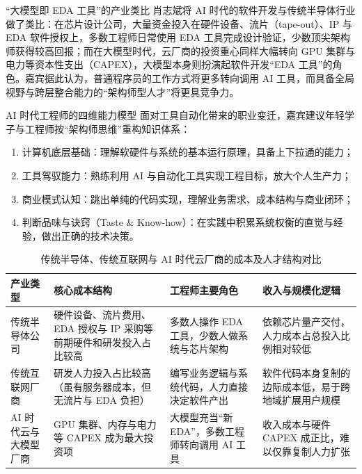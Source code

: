 \documentclass[UTF8,a4paper,11pt,fontset=fandol]{ctexart}
\begin{document}
\begin{importantbox}{“大模型即 EDA 工具”的产业类比}
肖志斌将 AI 时代的软件开发与传统半导体行业做了类比：在芯片设计公司，大量资金投入在硬件设备、流片（tape-out）、IP 与 EDA 软件授权上，多数工程师日常使用 EDA 工具完成设计验证，少数顶尖架构师获得较高回报；而在大模型时代，云厂商的投资重心同样大幅转向 GPU 集群与电力等资本性支出（CAPEX），大模型本身则扮演起软件开发“EDA 工具”的角色。嘉宾据此认为，普通程序员的工作方式将更多转向调用 AI 工具，而具备全局视野与跨层整合能力的“架构师型人才”将更具竞争力。
\end{importantbox}
\begin{knowledgebox}{AI 时代工程师的四维能力模型}
面对工具自动化带来的职业变迁，嘉宾建议年轻学子与工程师按“架构师思维”重构知识体系：
\begin{enumerate}
\item 计算机底层基础：理解软硬件与系统的基本运行原理，具备上下拉通的能力；
\item 工具驾驭能力：熟练利用 AI 与自动化工具实现工程目标，放大个人生产力；
\item 商业模式认知：跳出单纯的代码实现，理解业务需求、成本结构与商业闭环；
\item 判断品味与诀窍（Taste \& Know-how）：在实践中积累系统权衡的直觉与经验，做出正确的技术决策。
\end{enumerate}
\end{knowledgebox}
\begin{table}[H]\centering\small
\caption{传统半导体、传统互联网与 AI 时代云厂商的成本及人才结构对比}
\begin{tabular}{>{\raggedright\arraybackslash}p{\dimexpr(\linewidth-8\tabcolsep)/4\relax}>{\raggedright\arraybackslash}p{\dimexpr(\linewidth-8\tabcolsep)/4\relax}>{\raggedright\arraybackslash}p{\dimexpr(\linewidth-8\tabcolsep)/4\relax}>{\raggedright\arraybackslash}p{\dimexpr(\linewidth-8\tabcolsep)/4\relax}}
\toprule
产业类型 & 核心成本结构 & 工程师主要角色 & 收入与规模化逻辑\\\midrule
传统半导体公司 & 硬件设备、流片费用、EDA 授权与 IP 采购等前期硬件和研发投入占比较高 & 多数人操作 EDA 工具，少数人做系统与芯片架构 & 依赖芯片量产交付，人力成本占总投入比例相对较低\\[4pt]
传统互联网厂商 & 研发人力投入占比较高（虽有服务器成本，但无流片与 EDA 负担） & 编写业务逻辑与系统代码，人力直接决定软件产出 & 软件代码本身复制的边际成本低，易于跨地域扩展用户规模\\[4pt]
AI 时代云与大模型厂商 & GPU 集群、内存与电力等 CAPEX 成为最大投资项 & 大模型充当“新 EDA”，多数工程师转向调用 AI 工具 & 收入成本与硬件 CAPEX 成正比，难以仅靠复制人力扩张\\[4pt]
\bottomrule\end{tabular}\end{table}
\end{document}

